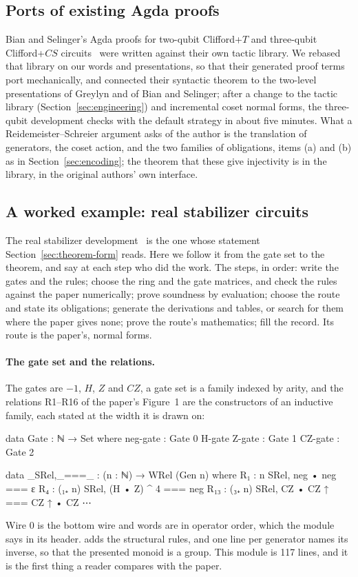 \subsection{Ports of existing Agda proofs}\label{sec:ports}

Bian and Selinger's Agda proofs for two-qubit Clifford+$T$ and
three-qubit Clifford+$CS$ circuits~\cite{bian2023cliffordt2,bian2023cliffordcs3}
were written against their own tactic library. We rebased that library
on our words and presentations, so that their generated proof terms
port mechanically, and connected their syntactic theorem to the
two-level presentations of Greylyn and of Bian and Selinger; after a
change to the tactic library (Section~\ref{sec:engineering}) and
incremental coset normal forms, the three-qubit development checks
with the default strategy in about five minutes. What a
Reidemeister--Schreier argument asks of the author is the translation
of generators, the coset action, and the two families of obligations,
items (a) and (b) as in Section~\ref{sec:encoding}; the theorem that
these give injectivity is in the library, in the original authors' own
interface.

\subsection{A worked example: real stabilizer circuits}\label{sec:example}

The real stabilizer development~\cite{makary2021real} is the one whose
statement Section~\ref{sec:theorem-form} reads. Here we follow it from
the gate set to the theorem, and say at each step who did the work.
The steps, in order: write the gates and the rules; choose the ring and
the gate matrices, and check the rules against the paper numerically;
prove soundness by evaluation; choose the route and state its
obligations; generate the derivations and tables, or search for them
where the paper gives none; prove the route's mathematics; fill the
record. Its route is the paper's, normal forms.

\paragraph{The gate set and the relations.} The gates are $-1$, $H$, $Z$
and $CZ$, a gate set is a family indexed by arity, and the relations
R1--R16 of the paper's Figure~1 are the constructors of an inductive
family, each stated at the width it is drawn on:
\begin{agdacode}
data Gate : ℕ → Set where
  neg-gate       : Gate 0
  H-gate Z-gate  : Gate 1
  CZ-gate        : Gate 2

data _SRel,_===_ : (n : ℕ) → WRel (Gen n) where
  R₁  : n SRel, neg • neg === ε
  R₄  : (₁₊ n) SRel, (H • Z) ^ 4 === neg
  R₁₃ : (₃₊ n) SRel, CZ • CZ ↑ === CZ ↑ • CZ
  ⋯
\end{agdacode}
Wire 0 is the bottom wire and words are in operator order, which the
module says in its header.  adds the structural
rules, and one line per generator names its inverse, so that the
presented monoid is a group. This module is 117 lines, and it is the
first thing a reader compares with the paper.


